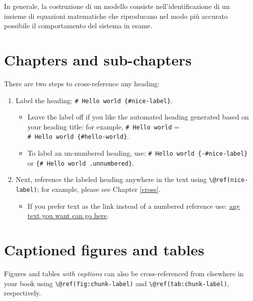 \documentclass[
]{book}
\providecommand{\tightlist}{%
  \setlength{\itemsep}{0pt}\setlength{\parskip}{0pt}}
\theoremstyle{definition}
\theoremstyle{definition}
\theoremstyle{definition}
\theoremstyle{definition}
\theoremstyle{remark}
\begin{document}
In generale, la costruzione di un modello consiste nell'identificazione di un insieme di equazioni matematiche che riproducano nel modo più accurato possibile il comportamento del sistema in esame.

\hypertarget{chapters-and-sub-chapters}{%
\section{Chapters and sub-chapters}\label{chapters-and-sub-chapters}}

There are two steps to cross-reference any heading:

\begin{enumerate}
\def\labelenumi{\arabic{enumi}.}
\tightlist
\item
  Label the heading: \texttt{\#\ Hello\ world\ \{\#nice-label\}}.

  \begin{itemize}
  \tightlist
  \item
    Leave the label off if you like the automated heading generated based on your heading title: for example, \texttt{\#\ Hello\ world} = \texttt{\#\ Hello\ world\ \{\#hello-world\}}.
  \item
    To label an un-numbered heading, use: \texttt{\#\ Hello\ world\ \{-\#nice-label\}} or \texttt{\{\#\ Hello\ world\ .unnumbered\}}.
  \end{itemize}
\item
  Next, reference the labeled heading anywhere in the text using \texttt{\textbackslash{}@ref(nice-label)}; for example, please see Chapter \ref{cross}.

  \begin{itemize}
  \tightlist
  \item
    If you prefer text as the link instead of a numbered reference use: \protect\hyperlink{cross}{any text you want can go here}.
  \end{itemize}
\end{enumerate}

\hypertarget{captioned-figures-and-tables}{%
\section{Captioned figures and tables}\label{captioned-figures-and-tables}}

Figures and tables \emph{with captions} can also be cross-referenced from elsewhere in your book using \texttt{\textbackslash{}@ref(fig:chunk-label)} and \texttt{\textbackslash{}@ref(tab:chunk-label)}, respectively.
\end{document}
